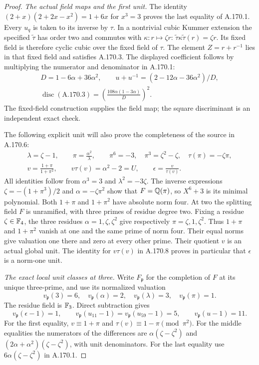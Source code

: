 \begin{proof}
\emph{The actual field maps and the first unit.}
The identity
\((2+x)(2+2x-x^2)=1+6x\) for \(x^3=3\) proves the last
equality of A.170.1.  Every \(u_q\) is taken to its inverse by
\(\tau\).  In a nontrivial cubic Kummer extension the specified
\(\widetilde\tau\) has order two and commutes with
\(\kappa:r\mapsto\zeta r\):
\(\widetilde\tau\kappa\widetilde\tau(r)=\zeta r\).
Its fixed field is therefore cyclic cubic over the fixed field of
\(\tau\).  The element \(Z=r+r^{-1}\) lies in that fixed field and
satisfies A.170.3.  The displayed coefficient follows by multiplying
the numerator and denominator in A.170.1:
\[
 \begin{gathered}
 D=1-6\alpha+36\alpha^2,\qquad
 u+u^{-1}=(2-12\alpha-36\alpha^2)/D,\\
 \operatorname{disc}(\text{A.170.3})
       =\left(\frac{108\alpha(1-3\alpha)}{D}\right)^2 .
 \end{gathered}
\tag{A.170.7}
\]
The fixed-field construction supplies the field map; the square
discriminant is an independent exact check.

The following explicit unit will also prove the completeness of
the source in A.170.6:
\[
 \begin{gathered}
 \lambda=\zeta-1,\qquad \pi=\frac{\alpha^2}{\lambda},\qquad
 \pi^6=-3,\quad \pi^3=\zeta^2-\zeta,\quad
 \tau(\pi)=-\zeta\pi,\\
 v=\frac{1+\pi}{1+\pi^2},\qquad
 v\tau(v)=\alpha^2-2=U,\qquad
 \epsilon=\frac{v}{\tau(v)}.
 \end{gathered}
\tag{A.170.8}
\]
All identities follow from \(\alpha^3=3\) and
\(\lambda^2=-3\zeta\).
The inverse expressions
\(\zeta=-(1+\pi^3)/2\) and \(\alpha=-\zeta\pi^2\)
show that \(F=\mathbb Q(\pi)\), so \(X^6+3\) is its minimal polynomial.
Both \(1+\pi\) and \(1+\pi^2\) have absolute norm four.
At two the splitting field \(F\) is unramified, with three primes
of residue degree two.  Fixing a residue \(\zeta\in\mathbb F_4\), the
three residues \(\alpha=1,\zeta,\zeta^2\) give respectively
\(\pi=\zeta,1,\zeta^2\).
Thus \(1+\pi\) and \(1+\pi^2\) vanish at one and the same prime
of norm four.  Their equal norms give valuation one there and zero at
every other prime.  Their quotient \(v\) is an actual global unit.
The identity for \(v\tau(v)\) in A.170.8 proves in particular that
\(\epsilon\) is a norm-one unit.

\emph{The exact local unit classes at three.}
Write \(F_{\mathfrak p}\) for the completion of \(F\) at its unique
three-prime, and use its normalized valuation
\[
 v_{\mathfrak p}(3)=6,\quad v_{\mathfrak p}(\alpha)=2,\quad
 v_{\mathfrak p}(\lambda)=3,\quad v_{\mathfrak p}(\pi)=1.
\tag{A.170.9}
\]
The residue field is \(\mathbb F_3\).  Direct subtraction gives
\[
 v_{\mathfrak p}(\epsilon-1)=1,\qquad
 v_{\mathfrak p}(u_{11}-1)=v_{\mathfrak p}(u_{59}-1)=5,\qquad
                         v_{\mathfrak p}(u-1)=11.
\tag{A.170.10}
\]
For the first equality, \(v\equiv1+\pi\) and
\(\tau(v)\equiv1-\pi\pmod{\pi^2}\).
For the middle equalities the numerators of the differences are
\(\alpha(\zeta-\zeta^2)\) and
\((2\alpha+\alpha^2)(\zeta-\zeta^2)\), with unit denominators.
For the last equality use \(6\alpha(\zeta-\zeta^2)\) in A.170.1.


\end{proof}
